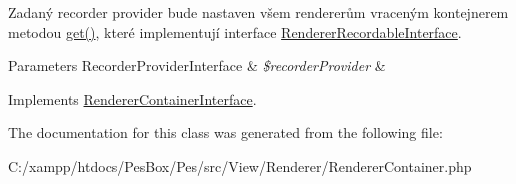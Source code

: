 Zadaný recorder provider bude nastaven všem rendererům vraceným kontejnerem metodou \mbox{\hyperlink{class_pes_1_1_view_1_1_renderer_1_1_renderer_container_a0df693c0d02fe85325f46e6ce9a1ffb6}{get()}}, které implementují interface \mbox{\hyperlink{interface_pes_1_1_view_1_1_renderer_1_1_renderer_recordable_interface}{Renderer\+Recordable\+Interface}}. 
\begin{DoxyParams}[1]{Parameters}
Recorder\+Provider\+Interface & {\em \$recorder\+Provider} & \\
\hline
\end{DoxyParams}


Implements \mbox{\hyperlink{interface_pes_1_1_view_1_1_renderer_1_1_renderer_container_interface}{Renderer\+Container\+Interface}}.



The documentation for this class was generated from the following file\+:\begin{DoxyCompactItemize}
\item 
C\+:/xampp/htdocs/\+Pes\+Box/\+Pes/src/\+View/\+Renderer/Renderer\+Container.\+php\end{DoxyCompactItemize}
